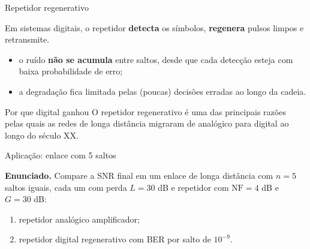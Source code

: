 \begin{frame}{Repetidor regenerativo}

Em sistemas digitais, o repetidor \textbf{detecta} os símbolos, \textbf{regenera} pulsos limpos e retransmite.

\vspace{0.3cm}

\begin{itemize}
\item o ruído \textbf{não se acumula} entre saltos, desde que cada detecção esteja com baixa probabilidade de erro;
\item a degradação fica limitada pelas (poucas) decisões erradas ao longo da cadeia.
\end{itemize}

\vspace{0.3cm}

\begin{block}{Por que digital ganhou}
O repetidor regenerativo é uma das principais razões pelas quais as redes de longa distância migraram de analógico para digital ao longo do século XX.
\end{block}

\end{frame}


\begin{frame}{Aplicação: enlace com 5 saltos}

\textbf{Enunciado.} Compare a SNR final em um enlace de longa distância com $n = 5$ saltos iguais, cada um com perda $L = 30$ dB e repetidor com $\mathrm{NF} = 4$ dB e $G = 30$ dB:
\begin{enumerate}
\item repetidor analógico amplificador;
\item repetidor digital regenerativo com BER por salto de $10^{-9}$.
\end{enumerate}

\begin{center}
\end{center}

\end{frame}

